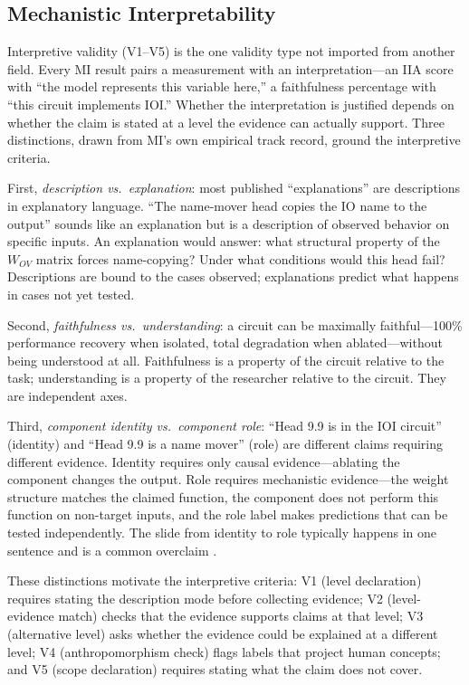 \documentclass{article}
\begin{document}
\subsection{Mechanistic Interpretability}
\label{sec:mi-lens}

Interpretive validity (V1--V5) is the one validity type not imported from another field. Every MI result pairs a measurement with an interpretation---an IIA score with ``the model represents this variable here,'' a faithfulness percentage with ``this circuit implements IOI.'' Whether the interpretation is justified depends on whether the claim is stated at a level the evidence can actually support. Three distinctions, drawn from MI's own empirical track record, ground the interpretive criteria.

First, \emph{description vs.\ explanation}: most published ``explanations'' are descriptions in explanatory language. ``The name-mover head copies the IO name to the output'' sounds like an explanation but is a description of observed behavior on specific inputs. An explanation would answer: what structural property of the $W_{OV}$ matrix forces name-copying? Under what conditions would this head fail? Descriptions are bound to the cases observed; explanations predict what happens in cases not yet tested.

Second, \emph{faithfulness vs.\ understanding}: a circuit can be maximally faithful---100\% performance recovery when isolated, total degradation when ablated---without being understood at all. Faithfulness is a property of the circuit relative to the task; understanding is a property of the researcher relative to the circuit. They are independent axes.

Third, \emph{component identity vs.\ component role}: ``Head 9.9 is in the IOI circuit'' (identity) and ``Head 9.9 is a name mover'' (role) are different claims requiring different evidence. Identity requires only causal evidence---ablating the component changes the output. Role requires mechanistic evidence---the weight structure matches the claimed function, the component does not perform this function on non-target inputs, and the role label makes predictions that can be tested independently. The slide from identity to role typically happens in one sentence and is a common overclaim \citep{wang2023interpretability}.

These distinctions motivate the interpretive criteria: V1 (level declaration) requires stating the description mode before collecting evidence; V2 (level-evidence match) checks that the evidence supports claims at that level; V3 (alternative level) asks whether the evidence could be explained at a different level; V4 (anthropomorphism check) flags labels that project human concepts; and V5 (scope declaration) requires stating what the claim does not cover.
\end{document}
